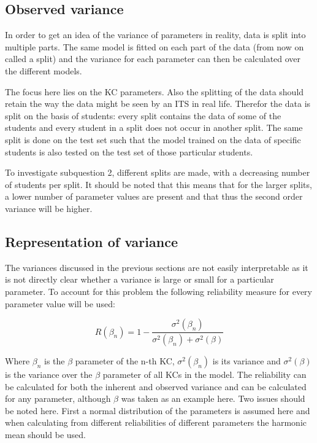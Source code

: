 \documentclass{scrartcl}
\begin{document}
\subsection{Observed variance}

In order to get an idea of the variance of parameters in reality, data is split into multiple parts. The same model is fitted on each part of the data (from now on called a split) and the variance for each parameter can then be calculated over the different models. 

The focus here lies on the KC parameters. Also the splitting of the data should retain the way the data might be seen by an ITS in real life. Therefor the data is split on the basis of students: every split contains the data of some of the students and every student in a split does not occur in another split. The same split is done on the test set such that the model trained on the data of specific students is also tested on the test set of those particular students.

To investigate subquestion 2, different splits are made, with a decreasing number of students per split. It should be noted that this means that for the larger splits, a lower number of parameter values are present and that thus the second order variance will be higher.

\subsection{Representation of variance}
The variances discussed in the previous sections are not easily interpretable as it is not directly clear whether a variance is large or small for a particular parameter. To account for this problem the following reliability measure for every parameter value will be used:

\begin{equation}
\label{eq:reliability}
R(\beta_{n}) = 1-\frac{\sigma^{2}(\beta_n)}{\sigma^{2}(\beta_{n})+\sigma^{2}(\beta)}
\end{equation}

Where $\beta_{n}$ is the $\beta$ parameter of the n-th KC, $\sigma^{2}(\beta_{n})$ is its variance and $\sigma^{2}(\beta)$ is the variance over the $\beta$ parameter of all KCs in the model. The reliability can be calculated for both the inherent and observed variance and can be calculated for any parameter, although $\beta$ was taken as an example here. Two issues should be noted here. First a normal distribution of the parameters is assumed here and when calculating from different reliabilities of different parameters the harmonic mean should be used.
\end{document}
